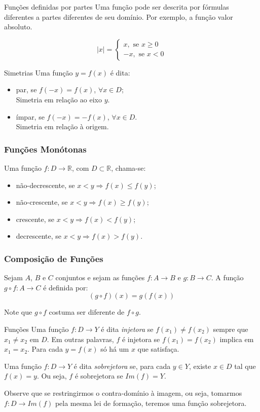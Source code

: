 \documentclass[hyperref={pdfpagelabels=false}]{beamer}
\begin{document}
\begin{frame}{Funções definidas por partes}
 Uma função pode ser descrita por fórmulas diferentes a partes diferentes de seu domínio. Por exemplo, a função valor absoluto. \pause

$$|x| = 
\begin{cases}
x, \text{  se } x \geq 0 \\
-x, \text{ se } x < 0
\end{cases}
$$
\end{frame}

\begin{frame}{Simetrias}
 Uma função $y=f(x)$ é dita:
\begin{itemize}
	\item par, se $f(-x) = f(x)$, $\forall x \in D$; \\ Simetria em relação ao eixo $y$.
	\item ímpar, se $f(-x) = -f(x)$, $\forall x \in D$. \\ Simetria em relação à origem.
\end{itemize}
\end{frame}


\begin{frame}
\frametitle{Funções Monótonas}

Uma função $f:D \rightarrow \mathbb{R}$, com $D \subset \mathbb{R}$, chama-se:
\begin{itemize}
	\item não-decrescente, se $x<y \Rightarrow f(x) \leq f(y)$;
	\item não-crescente, se $x<y \Rightarrow f(x) \geq f(y)$;
	\item crescente, se $x<y \Rightarrow f(x) < f(y)$;
	\item decrescente, se $x<y \Rightarrow f(x) > f(y)$.
\end{itemize}

\end{frame}

\begin{frame}
\frametitle{Composição de Funções}
Sejam $A$, $B$ e $C$ conjuntos e sejam as funções $f:A \rightarrow B$ e $g: B \rightarrow C$. A função $ g \circ f : A \rightarrow C$ é definida por:
$$(g \circ f)(x) = g(f(x))$$

Note que $g \circ f$ costuma ser diferente de $ f \circ g$.

\end{frame}

\begin{frame}{Funções}
 Uma função $f:D \rightarrow Y$ é dita {\it injetora} se $f(x_1) \neq f(x_2)$ sempre que $x_1 \neq x_2$ em $D$. Em outras palavras, $f$ é injetora se $f(x_1) = f(x_2)$ implica em $x_1 = x_2$. Para cada $y = f(x)$ só há um $x$ que satisfaça.
 \pause
 
 Uma função $f:D \rightarrow Y$ é dita {\it sobrejetora} se, para cada $y \in Y$, existe $x \in D$ tal que $f(x) = y$. Ou seja, $f$ é sobrejetora se $Im(f) = Y$. \pause

Observe que se restringirmos o contra-domínio à imagem, ou seja, tomarmos $f: D \rightarrow Im(f)$ pela mesma lei de formação, teremos uma função sobrejetora.
\end{frame}
\end{document}
